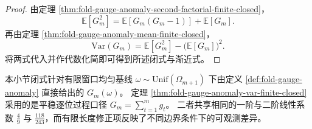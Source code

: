 \begin{proof}
由定理 \ref{thm:fold-gauge-anomaly-second-factorial-finite-closed}，
\[
\mathbb E[G_m^2]=\mathbb E[G_m(G_m-1)]+\mathbb E[G_m].
\]
再由定理 \ref{thm:fold-gauge-anomaly-mean-finite-closed}，
\[
\mathrm{Var}(G_m)=\mathbb E[G_m^2]-\bigl(\mathbb E[G_m]\bigr)^2.
\]
将两式代入并作代数化简即可得到所述闭式与渐近式。
\end{proof}

\begin{remark}[与平稳和口径的关系]\label{rem:fold-gauge-anomaly-finite-vs-stationary-moments}
本小节闭式针对有限窗口均匀基线 \(\omega\sim\mathrm{Unif}(\Omega_{m+1})\) 下由定义 \ref{def:fold-gauge-anomaly} 直接给出的 \(G_m(\omega)\)。
定理 \ref{thm:fold-gauge-anomaly-var-finite-closed} 采用的是平稳逐位过程口径 \(G_m=\sum_{t=1}^m g_t\)。
二者共享相同的一阶与二阶线性系数 \(\frac49\) 与 \(\frac{118}{243}\)，而有限长度修正项反映了不同边界条件下的可观测差异。
\end{remark}
